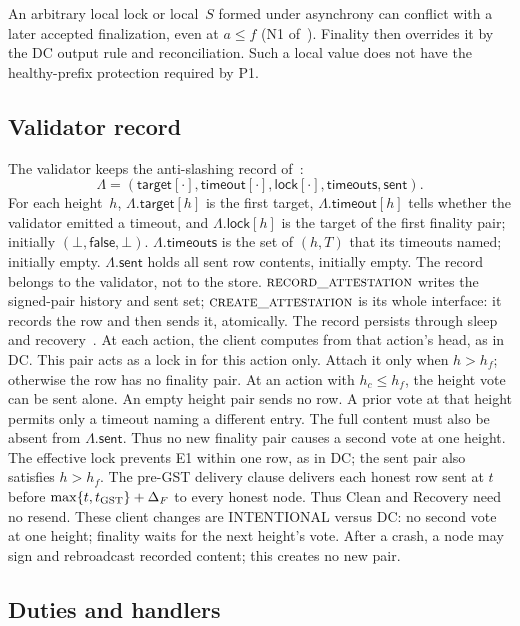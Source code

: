 \documentclass{article}
\theoremstyle{plain}
\theoremstyle{definition}
\theoremstyle{remark}
\newcommand{\fname}[1]{\text{\textsc{#1}}}
\newcommand{\DC}[1]{\cite[\S#1]{DC}}
\newcommand{\FAST}[1]{\cite[\S#1]{FAST}}
\begin{document}
An arbitrary local lock or local~$S$ formed under asynchrony can
conflict with a later accepted finalization, even at $a\leq f$
(N1 of~\cite[\S5]{FB}).  Finality then overrides it by the DC output
rule and reconciliation.  Such a local value does not have the
healthy-prefix protection required by P1.

\subsection{Validator record}\label{sec:record}

The validator keeps the anti-slashing record of~\DC{5}:
\[
 \Lambda=(\mathsf{target}[\cdot],\mathsf{timeout}[\cdot],
 \mathsf{lock}[\cdot],\mathsf{timeouts},\mathsf{sent}).
\]
For each height~$h$, $\Lambda.\mathsf{target}[h]$ is the first target,
$\Lambda.\mathsf{timeout}[h]$ tells whether the validator emitted a
timeout, and $\Lambda.\mathsf{lock}[h]$ is the target of the first
finality pair; initially $(\bot,\mathsf{false},\bot)$.
$\Lambda.\mathsf{timeouts}$ is the set of $(h,T)$ that its timeouts
named; initially empty.  $\Lambda.\mathsf{sent}$ holds all sent row contents,
initially empty.
The record belongs to the validator, not to the store.
$\Call{record\_attestation}{}$ writes the signed-pair history and sent set;
$\Call{create\_attestation}{}$ is its whole interface: it records the
row and then sends it, atomically.  The record persists through
sleep and recovery~\FAST{3.3}.  At each action, the client computes
\fname{finality\_pair} from that action's head, as in DC.
This pair acts as a lock in \fname{height\_pair} for this action only.
Attach it only when $h>h_f$; otherwise the row has no finality pair.
At an action with $h_c\leq h_f$, the height vote can be sent alone.
An empty height pair sends no row.  A prior vote at that height permits
only a timeout naming a different entry.  The full content must also
be absent from $\Lambda.\mathsf{sent}$.  Thus no new finality pair causes
a second vote at one height.  The effective lock prevents E1 within one
row, as in DC; the sent pair also satisfies $h>h_f$.
The pre-GST delivery clause delivers each honest row sent at $t$ before
$\max\{t,t_{\rm GST}\}+\Delta_F$ to every honest node.  Thus Clean and
Recovery need no resend.  These client changes are INTENTIONAL versus DC:
no second vote at one height; finality waits for the next height's vote.
After a crash, a node may sign and rebroadcast recorded content; this creates no new pair.

\subsection{Duties and handlers}\label{sec:public-handlers}
\end{document}
